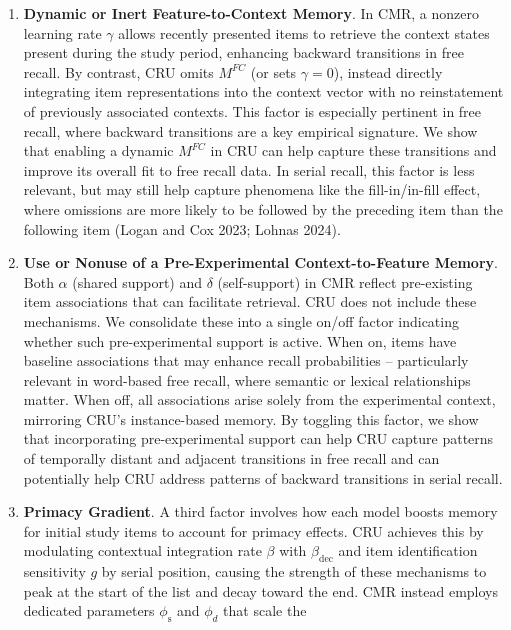 \documentclass[
  letterpaper,
  11pt,
  english,
  singlespacing,
  headsepline]{MastersDoctoralThesis}
\begin{document}
\begin{enumerate}
\def\labelenumi{\arabic{enumi}.}
\item
  \textbf{Dynamic or Inert Feature-to-Context Memory}. In CMR, a nonzero
  learning rate \(\gamma\) allows recently presented items to retrieve
  the context states present during the study period, enhancing backward
  transitions in free recall. By contrast, CRU omits \(M^{FC}\) (or sets
  \(\gamma=0\)), instead directly integrating item representations into
  the context vector with no reinstatement of previously associated
  contexts. This factor is especially pertinent in free recall, where
  backward transitions are a key empirical signature. We show that
  enabling a dynamic \(M^{FC}\) in CRU can help capture these
  transitions and improve its overall fit to free recall data. In serial
  recall, this factor is less relevant, but may still help capture
  phenomena like the fill-in/in-fill effect, where omissions are more
  likely to be followed by the preceding item than the following item
  (Logan and Cox 2023; Lohnas 2024).
\item
  \textbf{Use or Nonuse of a Pre-Experimental Context-to-Feature
  Memory}. Both \(\alpha\) (shared support) and \(\delta\)
  (self-support) in CMR reflect pre-existing item associations that can
  facilitate retrieval. CRU does not include these mechanisms. We
  consolidate these into a single on/off factor indicating whether such
  pre-experimental support is active. When on, items have baseline
  associations that may enhance recall probabilities -- particularly
  relevant in word-based free recall, where semantic or lexical
  relationships matter. When off, all associations arise solely from the
  experimental context, mirroring CRU's instance-based memory. By
  toggling this factor, we show that incorporating pre-experimental
  support can help CRU capture patterns of temporally distant and
  adjacent transitions in free recall and can potentially help CRU
  address patterns of backward transitions in serial recall.
\item
  \textbf{Primacy Gradient}. A third factor involves how each model
  boosts memory for initial study items to account for primacy effects.
  CRU achieves this by modulating contextual integration rate \(\beta\)
  with \(\beta_\text{dec}\) and item identification sensitivity \(g\) by
  serial position, causing the strength of these mechanisms to peak at
  the start of the list and decay toward the end. CMR instead employs
  dedicated parameters \(\phi_\text{s}\) and \(\phi_{d}\) that scale the

\end{enumerate}
\end{document}
